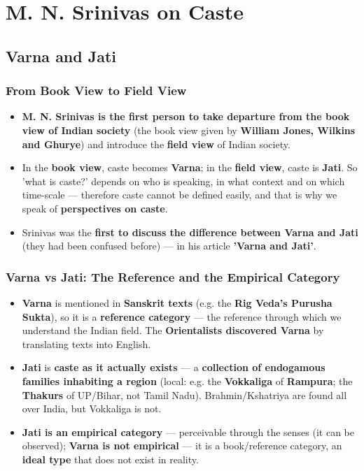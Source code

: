 \chapter{M. N. Srinivas on Caste}

\section{Varna and Jati}

\subsection{From Book View to Field View}

\begin{KeyConcept}
\begin{itemize}
\item \textbf{M. N. Srinivas is the first person to take departure from the book view of Indian society} (the book view given by \textbf{William Jones, Wilkins and Ghurye}) and introduce the \textbf{field view} of Indian society.
\item In the \textbf{book view}, caste becomes \textbf{Varna}; in the \textbf{field view}, caste is \textbf{Jati}. So 'what is caste?' depends on who is speaking, in what context and on which time-scale --- therefore caste cannot be defined easily, and that is why we speak of \textbf{perspectives on caste}.
\item Srinivas was the \textbf{first to discuss the difference between Varna and Jati} (they had been confused before) --- in his article \textbf{'Varna and Jati'}.
\end{itemize}
\end{KeyConcept}

\subsection{Varna vs Jati: The Reference and the Empirical Category}

\begin{KeyConcept}
\begin{itemize}
\item \textbf{Varna} is mentioned in \textbf{Sanskrit texts} (e.g. the \textbf{Rig Veda's Purusha Sukta}), so it is a \textbf{reference category} --- the reference through which we understand the Indian field. The \textbf{Orientalists discovered Varna} by translating texts into English.
\item \textbf{Jati} is \textbf{caste as it actually exists} --- a \textbf{collection of endogamous families inhabiting a region} (local: e.g. the \textbf{Vokkaliga} of \textbf{Rampura}; the \textbf{Thakurs} of UP/Bihar, not Tamil Nadu). Brahmin/Kshatriya are found all over India, but Vokkaliga is not.
\item \textbf{Jati is an empirical category} --- perceivable through the senses (it can be observed); \textbf{Varna is not empirical} --- it is a book/reference category, an \textbf{ideal type} that does not exist in reality.
\end{itemize}
\end{KeyConcept}

